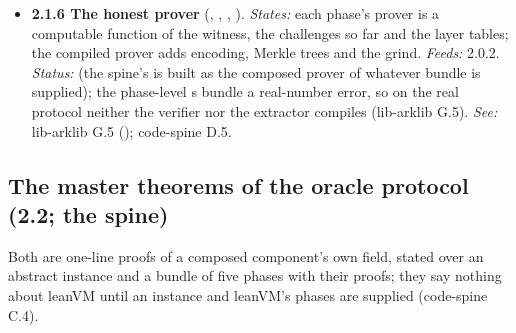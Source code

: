 \begin{itemize}[label={}, leftmargin=1.3em, itemindent=-1.3em, labelwidth=0pt, labelsep=0pt, itemsep=4pt, topsep=3pt]
\item {}\label{obl:node-2.1.6}\textbf{2.1.6 The honest prover} (, , , ). \emph{States:} each phase's prover is a computable function of the witness, the challenges so far and the layer tables; the compiled prover adds encoding, Merkle trees and the grind. \emph{Feeds:} 2.0.2. \emph{Status:}  (the spine's  is built as the composed prover of whatever bundle is supplied); the phase-level s bundle a real-number error, so on the real protocol neither the verifier nor the extractor compiles (lib-arklib G.5). \emph{See:} lib-arklib G.5 (); code-spine D.5.
\end{itemize}

\subsection[The master theorems (2.2)]{The master theorems of the oracle protocol (2.2; the spine)}\label{sec:obl-tier-master}

Both are one-line proofs of a composed component's own field, stated over an abstract instance  and a bundle  of five phases with their proofs; they say nothing about leanVM until an instance and leanVM's phases are supplied (code-spine C.4).

